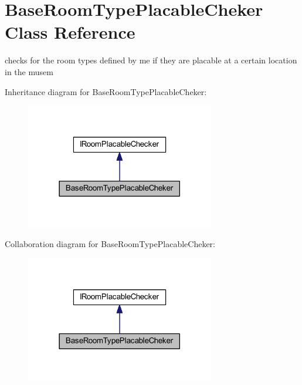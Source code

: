 \hypertarget{class_base_room_type_placable_cheker}{}\section{Base\+Room\+Type\+Placable\+Cheker Class Reference}
\label{class_base_room_type_placable_cheker}


checks for the room types defined by me if they are placable at a certain location in the musem  




Inheritance diagram for Base\+Room\+Type\+Placable\+Cheker\+:
\nopagebreak
\begin{figure}[H]
\begin{center}
\leavevmode
\includegraphics[width=234pt]{class_base_room_type_placable_cheker__inherit__graph}
\end{center}
\end{figure}


Collaboration diagram for Base\+Room\+Type\+Placable\+Cheker\+:
\nopagebreak
\begin{figure}[H]
\begin{center}
\leavevmode
\includegraphics[width=234pt]{class_base_room_type_placable_cheker__coll__graph}
\end{center}
\end{figure}
